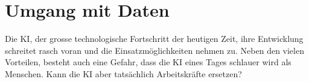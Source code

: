 \chapter{Umgang mit Daten}
\label{chap:Daten}

Die KI, der grosse technologische Fortschritt der heutigen Zeit, ihre  Entwicklung  schreitet rasch voran und die Einsatzmöglichkeiten nehmen zu. Neben den vielen Vorteilen, besteht auch eine Gefahr, dass die KI eines Tages schlauer wird als Menschen. Kann die KI aber tatsächlich Arbeitskräfte ersetzen?